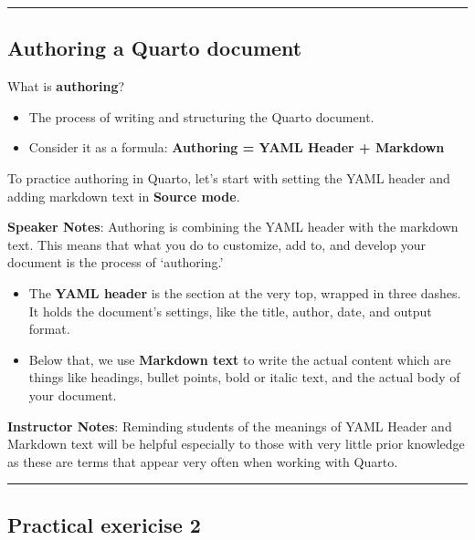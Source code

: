 \documentclass[
  letterpaper,
  DIV=11,
  numbers=noendperiod]{scrartcl}
\providecommand{\tightlist}{%
  \setlength{\itemsep}{0pt}\setlength{\parskip}{0pt}}
\begin{document}
\begin{center}\rule{0.5\linewidth}{0.5pt}\end{center}

\subsection{Authoring a Quarto
document}\label{authoring-a-quarto-document}

What is \textbf{authoring}?

\begin{itemize}
\tightlist
\item
  The process of writing and structuring the Quarto document.
\item
  Consider it as a formula: \textbf{Authoring = YAML Header + Markdown}
\end{itemize}

To practice authoring in Quarto, let's start with setting the YAML
header and adding markdown text in \textbf{Source mode}.

\textbf{Speaker Notes}: Authoring is combining the YAML header with the
markdown text. This means that what you do to customize, add to, and
develop your document is the process of `authoring.'

\begin{itemize}
\item
  The \textbf{YAML header} is the section at the very top, wrapped in
  three dashes. It holds the document's settings, like the title,
  author, date, and output format.
\item
  Below that, we use \textbf{Markdown text} to write the actual content
  which are things like headings, bullet points, bold or italic text,
  and the actual body of your document.
\end{itemize}

\textbf{Instructor Notes}: Reminding students of the meanings of YAML
Header and Markdown text will be helpful especially to those with very
little prior knowledge as these are terms that appear very often when
working with Quarto.

\begin{center}\rule{0.5\linewidth}{0.5pt}\end{center}

\subsection{Practical exericise 2}\label{practical-exericise-2}
\end{document}
